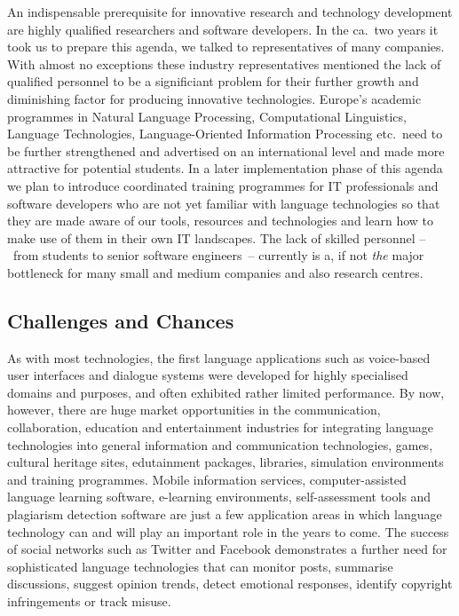 \documentclass[10pt, plain]{../../metanetpaper}
\begin{document}
\begin{multicols}{2}
An indispensable prerequisite for innovative research and technology development are highly qualified researchers and software developers. In the ca.~two years it took us to prepare this agenda, we talked to representatives of many companies. With almost no exceptions these industry representatives mentioned the lack of qualified personnel to be a significiant problem for their further growth and diminishing factor for producing innovative technologies. Europe's academic programmes in Natural Language Processing, Computational Linguistics, Language Technologies, Language-Oriented Information Processing etc.~need to be further strengthened and advertised on an international level and made more attractive for potential students. In a later implementation phase of this agenda we plan to introduce coordinated training programmes for IT professionals and software developers who are not yet familiar with language technologies so that they are made aware of our tools, resources and technologies and learn how to make use of them in their own IT landscapes. The lack of skilled personnel --~from students to senior software engineers~-- currently is a, if not \emph{the} major bottleneck for many small and medium companies and also research centres.

\subsection{Challenges and Chances}
\label{sec:challenges-chances}

As with most technologies, the first language applications such as voice-based user interfaces and dialogue systems were developed for highly specialised domains and purposes, and often exhibited rather limited performance. By now, however, there are huge market opportunities in the communication, collaboration, education and entertainment industries for integrating language technologies into general information and communication technologies, games, cultural heritage sites, edutainment packages, libraries, simulation environments and training programmes. Mobile information services, computer-assisted language learning software, e-learning environments, self-assessment tools and plagiarism detection software are just a few application areas in which language technology can and will play an important role in the years to come. The success of social networks such as Twitter and Facebook demonstrates a further need for sophisticated language technologies that can monitor posts, summarise discussions, suggest opinion trends, detect emotional responses, identify copyright infringements or track misuse.


\end{multicols}
\end{document}
